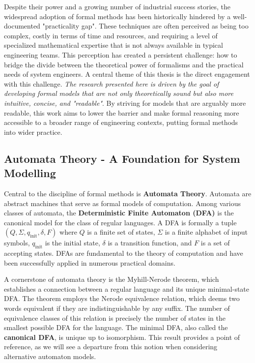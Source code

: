 Despite their power and a growing number of industrial success stories, the widespread adoption of formal methods has been historically hindered by a well-documented "practicality gap". These techniques are often perceived as being too complex, costly in terms of time and resources, and requiring a level of specialized mathematical expertise that is not always available in typical engineering teams. This perception has created a persistent challenge: how to bridge the divide between the theoretical power of formalisms and the practical needs of system engineers. A central theme of this thesis is the direct engagement with this challenge. \emph{The research presented here is driven by the goal of developing formal models that are not only theoretically sound but also more intuitive, concise, and "readable"}. By striving for models that are arguably more readable, this work aims to lower the barrier and make formal reasoning more accessible to a broader range of engineering contexts, putting formal methods into wider practice.

\subsection*{Automata Theory - A Foundation for System Modelling}
Central to the discipline of formal methods is \textbf{Automata Theory}. Automata are abstract machines that serve as formal models of computation. Among various classes of automata, the \textbf{Deterministic Finite Automaton (DFA)} is the canonical model for the class of regular languages. A DFA is formally a tuple $(Q, \Sigma, q_{\text{init}}, \delta, F)$ where $Q$ is a finite set of states, $\Sigma$ is a finite alphabet of input symbols, $q_{\text{init}}$ is the initial state, $\delta$ is a transition function, and $F$ is a set of accepting states. 
DFAs are fundamental to the theory of computation and have been successfully applied in numerous practical domains.

A cornerstone of automata theory is the Myhill-Nerode theorem, which establishes a connection between a regular language and its unique minimal-state DFA. The theorem {employs} the Nerode equivalence relation, which deems two words equivalent if they are indistinguishable by any suffix. The number of equivalence classes of this relation is precisely the number of states in the smallest possible DFA for the language. The minimal DFA, also called the \textbf{canonical DFA}, is unique up to isomorphism. This result provides a point of reference, as we will see a departure from this notion when considering alternative automaton models.

